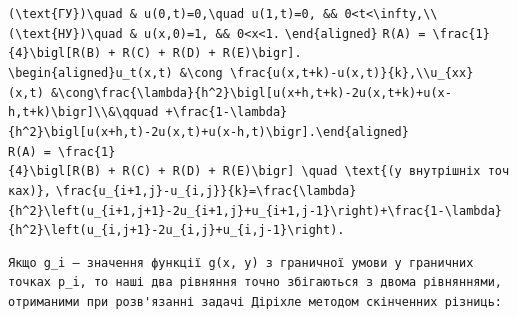 \documentclass[
  ukrainian,
]{article}
\begin{document}
\texttt{(\textbackslash{}text\{ГУ\})\textbackslash{}quad\ \&\ u(0,t)=0,\textbackslash{}quad\ u(1,t)=0,\ \&\&\ 0\textless{}t\textless{}\textbackslash{}infty,\textbackslash{}\textbackslash{}}
\texttt{(\textbackslash{}text\{НУ\})\textbackslash{}quad\ \&\ u(x,0)=1,\ \&\&\ 0\textless{}x\textless{}1.}
\texttt{\textbackslash{}end\{aligned\}}
\texttt{R(A)\ =\ \textbackslash{}frac\{1\}\{4\}\textbackslash{}bigl{[}R(B)\ +\ R(C)\ +\ R(D)\ +\ R(E)\textbackslash{}bigr{]}.}
\texttt{\textbackslash{}begin\{aligned\}u\_t(x,t)\ \&\textbackslash{}cong\ \textbackslash{}frac\{u(x,t+k)-u(x,t)\}\{k\},\textbackslash{}\textbackslash{}u\_\{xx\}(x,t)\ \&\textbackslash{}cong\textbackslash{}frac\{\textbackslash{}lambda\}\{h\^{}2\}\textbackslash{}bigl{[}u(x+h,t+k)-2u(x,t+k)+u(x-h,t+k)\textbackslash{}bigr{]}\textbackslash{}\textbackslash{}\&\textbackslash{}qquad\ +\textbackslash{}frac\{1-\textbackslash{}lambda\}\{h\^{}2\}\textbackslash{}bigl{[}u(x+h,t)-2u(x,t)+u(x-h,t)\textbackslash{}bigr{]}.\textbackslash{}end\{aligned\}}
\texttt{R(A)\ =\ \textbackslash{}frac\{1\}\{4\}\textbackslash{}bigl{[}R(B)\ +\ R(C)\ +\ R(D)\ +\ R(E)\textbackslash{}bigr{]}\ \textbackslash{}quad\ \textbackslash{}text\{(у\ внутрішніх\ точках)\},}
\texttt{\textbackslash{}frac\{u\_\{i+1,j\}-u\_\{i,j\}\}\{k\}=\textbackslash{}frac\{\textbackslash{}lambda\}\{h\^{}2\}\textbackslash{}left(u\_\{i+1,j+1\}-2u\_\{i+1,j\}+u\_\{i+1,j-1\}\textbackslash{}right)+\textbackslash{}frac\{1-\textbackslash{}lambda\}\{h\^{}2\}\textbackslash{}left(u\_\{i,j+1\}-2u\_\{i,j\}+u\_\{i,j-1\}\textbackslash{}right).}

\begin{verbatim}
Якщо g_i — значення функції g(x, y) з граничної умови у граничних точках p_i, то наші два рівняння точно збігаються з двома рівняннями, отриманими при розв'язанні задачі Діріхле методом скінченних різниць:
\end{verbatim}
\end{document}
